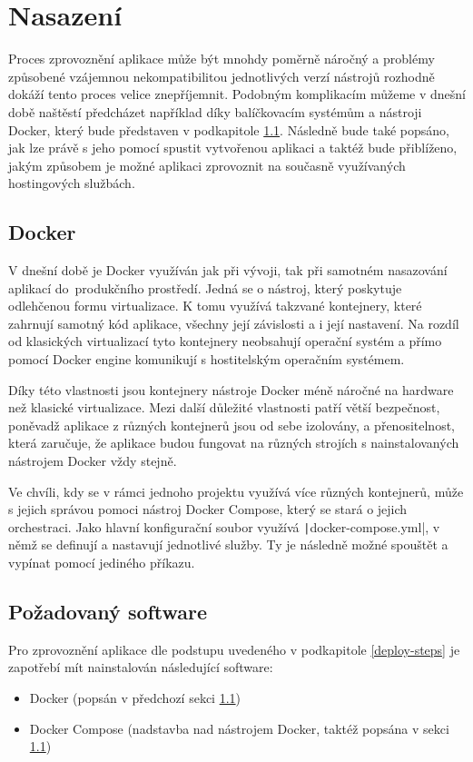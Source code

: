 \chapter{Nasazení}
Proces zprovoznění aplikace může být mnohdy poměrně náročný a problémy způsobené vzájemnou nekompatibilitou jednotlivých verzí nástrojů rozhodně dokáží tento proces velice znepříjemnit. Podobným komplikacím můžeme v dnešní době naštěstí předcházet například díky balíčkovacím systémům a nástroji Docker, který bude představen v podkapitole \ref{docker}. Následně bude také popsáno, jak lze právě s jeho pomocí spustit vytvořenou aplikaci a taktéž bude přiblíženo, jakým způsobem je možné aplikaci zprovoznit na současně využívaných hostingových službách.

\section{Docker}\label{docker}
V dnešní době je Docker využíván jak při vývoji, tak při samotném nasazování aplikací do~produkčního prostředí. Jedná se o nástroj, který poskytuje odlehčenou formu virtualizace. K tomu využívá takzvané kontejnery, které zahrnují samotný kód aplikace, všechny její závislosti a i její nastavení. Na rozdíl od klasických virtualizací tyto kontejnery neobsahují operační systém a přímo pomocí Docker engine komunikují s hostitelským operačním systémem. \cite{docker}

Díky této vlastnosti jsou kontejnery nástroje Docker méně náročné na hardware než klasické virtualizace. Mezi další důležité vlastnosti patří větší bezpečnost, poněvadž aplikace z různých kontejnerů jsou od sebe izolovány, a přenositelnost, která zaručuje, že aplikace budou fungovat na různých strojích s nainstalovaných nástrojem Docker vždy stejně. \cite{docker}

Ve chvíli, kdy se v rámci jednoho projektu využívá více různých kontejnerů, může s jejich správou pomoci nástroj Docker Compose, který se stará o jejich orchestraci. Jako hlavní konfigurační soubor využívá \texttt|docker-compose.yml|, v němž se definují a nastavují jednotlivé služby. Ty je následně možné spouštět a vypínat pomocí jediného příkazu.

\section{Požadovaný software}
Pro zprovoznění aplikace dle podstupu uvedeného v podkapitole \ref{deploy-steps} je zapotřebí mít nainstalován následující software:
\begin{itemize}
	\item Docker (popsán v předchozí sekci \ref{docker})
	\item Docker Compose (nadstavba nad nástrojem Docker, taktéž popsána v sekci \ref{docker})
\end{itemize}

